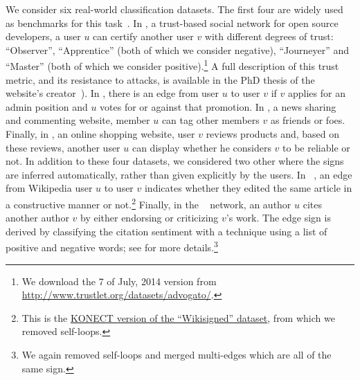 We consider six real-world classification datasets. The first four are \dssn{} widely
used as benchmarks for this
task~\autocites{Leskovec2010}{shahriari2014ranking}{wu2016troll}{OnlineCompletion17}.
In \adv{}, a trust-based social network for open source developers, a user $u$ can certify another
user $v$ with different degrees of trust: \enquote{Observer}, \enquote{Apprentice} (both of which we
consider negative), \enquote{Journeyer} and \enquote{Master} (both of which we consider
positive).\footnote{We download the 7\thup{} of July, 2014 version from
\url{http://www.trustlet.org/datasets/advogato/}.} A full description of this trust metric, and its
resistance to attacks, is available in the PhD thesis of the website's creator~\autocite[Section
4]{AdvogatoTrustThesis02}).
In \wik{}, there is an edge from user $u$ to user $v$ if $v$ applies for an admin position and $u$
votes for or against that promotion. In \sla{}, a news sharing and commenting website, member $u$
can tag other members $v$ as friends or foes. Finally, in \epi{}, an online shopping website, user
$v$ reviews products and, based on these reviews, another user $u$ can display whether he considers
$v$ to be reliable or not. In addition to these four datasets, we considered two other \ssn{} where
the signs are inferred automatically, rather than given explicitly by the users.  In
\kiw{}~\cite{wikiedits11}, an edge from Wikipedia user $u$ to user $v$ indicates whether they edited
the same article in a constructive manner or not.\footnote{This is the
\href{http://konect.uni-koblenz.de/networks/wikisigned-k2}{KONECT version of the
\enquote{Wikisigned} dataset}, from which we removed self-loops.} Finally, in the
\aut{}~\cite{kumar2016structure} network, an author $u$ cites another author $v$ by either endorsing
or criticizing $v$'s work. The edge sign is derived by classifying the citation sentiment with a
technique using a list of positive and negative words; see
\cite{kumar2016structure} for more details.\footnote{We again removed self-loops and merged
multi-edges which are all of the same sign.}

